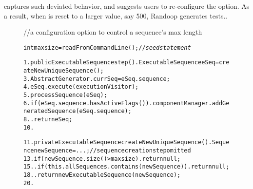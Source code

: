 \ourtool captures such deviated behavior, and suggests users to
re-configure the  option. As a result, when 
is reset to a larger value, say 500, Randoop generates tests..

\begin{figure}[t]
\vspace{-2mm}
\small{//a configuration option to control a sequence's max length}
\vspace{-2mm}
\begin{CodeOut}
\begin{alltt}
int maxsize = readFromCommandLine();  //\textit{seed statement}

1.  public ExecutableSequence step() .    ExecutableSequence eSeq = createNewUniqueSequence();
3.    AbstractGenerator.currSeq = eSeq.sequence;
4.    eSeq.execute(executionVisitor);
5.    processSequence(eSeq);
6.    if (eSeq.sequence.hasActiveFlags()) .      componentManager.addGeneratedSequence(eSeq.sequence);
8.    .    return eSeq;
10. \ttrcb

11. private ExecutableSequence createNewUniqueSequence() .   Sequence newSequence = ...; //sequence creation step omitted
13.   if (newSequence.size() > maxsize) .     return null;
15.   .   if (this.allSequences.contains(newSequence)) .     return null;
18.   .   return new ExecutableSequence(newSequence);
20. \ttrcb
\end{alltt}
\end{CodeOut}
\tinystep
\vspace*{-3.0ex}  %
\end{figure}




